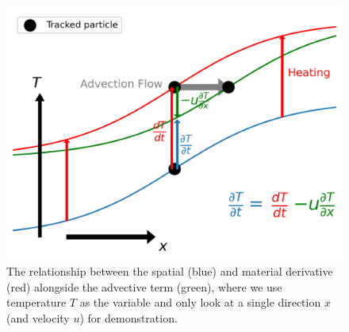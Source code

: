 \begin{figure}[ht!]
    \centering
    \includegraphics[scale=0.8]{graphics/advect.png}
    \caption{The relationship between the spatial (blue) and material derivative (red) alongside the advective term (green), where we use temperature $T$ as the variable and only look at a single direction $x$ (and velocity $u$) for demonstration.}
    \label{fig:advection}
\end{figure}

